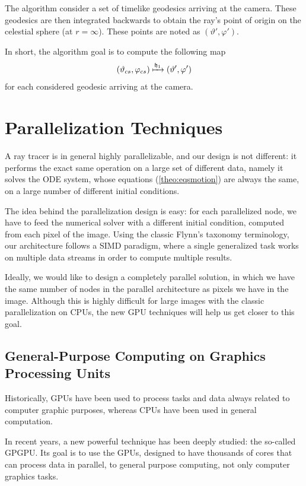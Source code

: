 The algorithm consider a set of timelike geodesics arriving at the camera. These geodesics are then integrated backwards to obtain the ray's point of origin on the celestial sphere (at $r = \infty$). These points are noted as $(\vartheta', \varphi')$.

In short, the algorithm goal is to compute the following map
\begin{equation}
	\label{eq:initmap}
	(\vartheta_{cs}, \varphi_{cs}) \xmapsto{\mathfrak{h}_1} (\vartheta', \varphi')
\end{equation}
for each considered geodesic arriving at the camera.

\section{Parallelization Techniques}
\label{sec:parallel}

A ray tracer is in general highly parallelizable, and our design is not different: it performs the exact same operation on a large set of different data, namely it solves the \ac{ODE} system, whose equations (\autoref{theo:eqsmotion}) are always the same, on a large number of different initial conditions.

The idea behind the parallelization design is easy: for each parallelized node, we have to feed the numerical solver with a different initial condition, computed from each pixel of the image. Using the classic Flynn's taxonomy \cite{flynn72} terminology, our architecture follows a \ac{SIMD} paradigm, where a single generalized task works on multiple data streams in order to compute multiple results.

Ideally, we would like to design a completely parallel solution, in which we have the same number of nodes in the parallel architecture as pixels we have in the image. Although this is highly difficult for large images with the classic parallelization on \acp{CPU}, the new \ac{GPU} techniques will help us get closer to this goal.

\subsection{General-Purpose Computing on Graphics Processing Units}

Historically, \acp{GPU} have been used to process tasks and data always related to computer graphic purposes, whereas \acp{CPU} have been used in general computation.

In recent years, a new powerful technique has been deeply studied: the so-called \ac{GPGPU}. Its goal is to use the \acp{GPU}, designed to have thousands of cores that can process data in parallel, to general purpose computing, not only computer graphics tasks.

